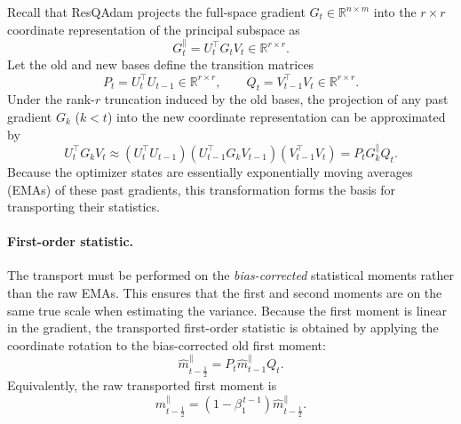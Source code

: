 \documentclass{article} %
\begin{document}
Recall that ResQAdam projects the full-space gradient $G_t\in\mathbb{R}^{n\times m}$
into the $r\times r$ coordinate representation of the principal subspace as
\begin{equation}
    G_t^{\parallel} = U_t^\top G_t V_t \in \mathbb{R}^{r\times r}.
\end{equation}
Let the old and new bases define the transition matrices
\begin{equation}
    P_t = U_t^\top U_{t-1} \in \mathbb{R}^{r\times r},
    \qquad
    Q_t = V_{t-1}^\top V_t \in \mathbb{R}^{r\times r}.
\end{equation}
Under the rank-$r$ truncation induced by the old bases, the projection of any past gradient $G_k$ ($k < t$) into the new coordinate representation can be approximated by
\begin{equation}
    U_t^\top G_k V_t
    \approx
    \left(U_t^\top U_{t-1}\right)
    \left(U_{t-1}^\top G_k V_{t-1}\right)
    \left(V_{t-1}^\top V_t\right)
    =
    P_t G_k^{\parallel} Q_t .
\end{equation}
Because the optimizer states are essentially exponentially moving averages (EMAs) of these past gradients, this transformation forms the basis for transporting their statistics.

\paragraph{First-order statistic.}
The transport must be performed on the \textit{bias-corrected} statistical moments rather than the raw EMAs. This ensures that the first and second moments are on the same true scale when estimating the variance. Because the first moment is linear in the gradient, the transported first-order statistic is obtained by applying the coordinate rotation to the bias-corrected old first moment:
\begin{equation}
    \widehat{m}_{t-\frac{1}{2}}^{\parallel}
    =
    P_t \widehat{m}_{t-1}^{\parallel} Q_t .
\end{equation}
Equivalently, the raw transported first moment is
\begin{equation}
    m_{t-\frac{1}{2}}^{\parallel}
    =
    \left(1-\beta_1^{\,t-1}\right)
    \widehat{m}_{t-\frac{1}{2}}^{\parallel} .
\end{equation}
\end{document}
